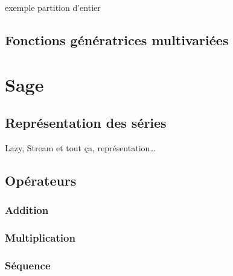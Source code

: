 \documentclass[12pt]{article}
\begin{document}
exemple partition d'entier
\subsection{Fonctions génératrices multivariées}

\section{Sage}

\subsection{Représentation des séries}
Lazy, Stream et tout ça, représentation…
\subsection{Opérateurs}
\subsubsection{Addition}
\subsubsection{Multiplication}
\subsubsection{Séquence}
\end{document}
